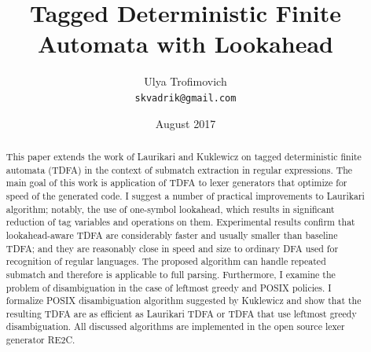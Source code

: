 \documentclass{article}
\title{Tagged Deterministic Finite Automata with Lookahead}
\author{Ulya Trofimovich\\
\texttt{\small{skvadrik@gmail.com}}}
\date{August 2017}
\theoremstyle{definition}
\begin{document}
\maketitle

\begin{abstract}
\noindent
This paper extends the work of Laurikari \cite{Lau00} \cite{Lau01}
and Kuklewicz \cite{Kuk07} on tagged deterministic finite automata (TDFA)
in the context of submatch extraction in regular expressions.
The main goal of this work is application of TDFA to lexer generators that optimize for speed of the generated code.
I suggest a number of practical improvements to Laurikari algorithm;
notably, the use of one-symbol lookahead, which results in significant reduction of tag variables and operations on them.
Experimental results confirm that lookahead-aware TDFA are considerably faster and usually smaller than baseline TDFA;
and they are reasonably close in speed and size to ordinary DFA used for recognition of regular languages.
The proposed algorithm can handle repeated submatch and therefore is applicable to full parsing.
Furthermore, I examine the problem of disambiguation in the case of leftmost greedy and POSIX policies.
I formalize POSIX disambiguation algorithm suggested by Kuklewicz
and show that the resulting TDFA are as efficient as Laurikari TDFA or TDFA that use leftmost greedy disambiguation.
All discussed algorithms are implemented in the open source lexer generator RE2C.
\end{abstract}
\vspace{1em}
\end{document}
